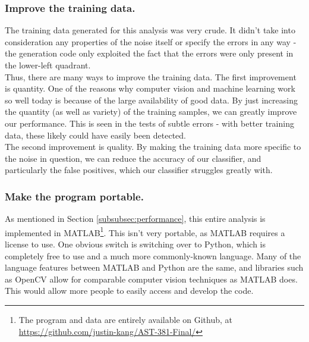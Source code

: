\documentclass[twocolumn,longauthor]{aastex61}
\begin{document}
\subsubsection{Improve the training data.} \label{subsubsec:training}
\noindent The training data generated for this analysis was very crude. It didn't take into consideration any properties of the noise itself or specify the errors in any way - the generation code only exploited the fact that the errors were only present in the lower-left quadrant.\\
\indent Thus, there are many ways to improve the training data. The first improvement is quantity. One of the reasons why computer vision and machine learning work so well today is because of the large availability of good data. By just increasing the quantity (as well as variety) of the training samples, we can greatly improve our performance. This is seen in the tests of subtle errors - with better training data, these likely could have easily been detected.\\
\indent The second improvement is quality. By making the training data more specific to the noise in question, we can reduce the accuracy of our classifier, and particularly the false positives, which our classifier struggles greatly with. 

\subsubsection{Make the program portable.} \label{subsubsec:portability}
\noindent As mentioned in Section \ref{subsubsec:performance}, this entire analysis is implemented in MATLAB\footnote{The program and data are entirely available on Github, at \url{https://github.com/justin-kang/AST-381-Final/}}. This isn't very portable, as MATLAB requires a license to use. One obvious switch is switching over to Python, which is completely free to use and a much more commonly-known language. Many of the language features between MATLAB and Python are the same, and libraries such as OpenCV allow for comparable computer vision techniques as MATLAB does. This would allow more people to easily access and develop the code.
\end{document}
